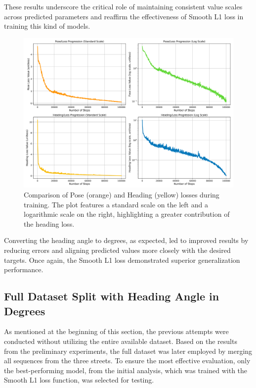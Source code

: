 These results underscore the critical role of maintaining consistent value scales across predicted parameters and reaffirm the effectiveness of Smooth L1 loss in training this kind of models.
\begin{figure}[H]
    \centering
    \includegraphics[width=1\linewidth]{LateX//figs/l1s_111_DEG_pose_heading_loss_comparison.png}
    \caption{Comparison of Pose (orange) and Heading (yellow) losses during training. The plot features a standard scale on the left and a logarithmic scale on the right, highlighting a greater contribution of the heading loss.}
    \label{fig:deg-l1s-loss-comparison}
\end{figure}

Converting the heading angle to degrees, as expected, led to improved results by reducing errors and aligning predicted values more closely with the desired targets. Once again, the Smooth L1 loss demonstrated superior generalization performance.

\subsection*{Full Dataset Split with Heading Angle in Degrees}
As mentioned at the beginning of this section, the previous attempts were conducted without utilizing the entire available dataset. Based on the results from the preliminary experiments, the full dataset was later employed by merging all sequences from the three streets. To ensure the most effective evaluation, only the best-performing model, from the initial analysis, which was trained with the Smooth L1 loss function, was selected for testing. 

